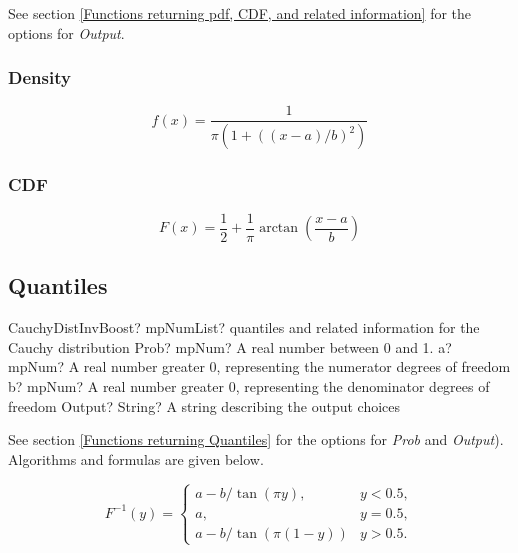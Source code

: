 \vspace{0.3cm}
See section \ref{Functions returning pdf, CDF, and related information} for the options for {\itshape\sffamily Output}. 


\subsubsection{Density}
\label{CauchyDistributionDensity}

\begin{equation} 
	f(x)=\frac{1}{\pi(1+((x-a)/b)^2)}
\end{equation}


\subsubsection{CDF}
\begin{equation} 
	F(x)=\frac{1}{2} + \frac{1}{\pi} \arctan \left(\frac{x-a}{b} \right)
\end{equation}



\subsection{Quantiles}
\begin{mpFunctionsExtract}
	\mpFunctionFourNotImplemented
	{CauchyDistInvBoost? mpNumList? quantiles and related information for the Cauchy distribution}
	{Prob? mpNum? A real number between 0 and 1.}
	{a? mpNum? A real number greater 0, representing the numerator  degrees of freedom}
	{b? mpNum? A real number greater 0, representing the denominator degrees of freedom}
	{Output? String? A string describing the output choices}
\end{mpFunctionsExtract}

See section \ref{Functions returning Quantiles} for the options for  {\itshape\sffamily Prob} and {\itshape\sffamily Output}). Algorithms and formulas are given below.

\begin{equation}
	F^{-1}(y)=\begin{cases}
		a-b/\tan(\pi y), & y<0.5,\\
		a, &  y=0.5,\\
		a-b/\tan(\pi (1-y)) & y>0.5.
	\end{cases}
\end{equation}




